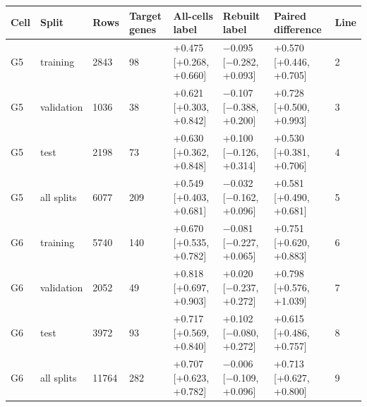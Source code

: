 \begin{tabular}{llllllll}
\toprule
Cell & Split & Rows & Target genes & All-cells label & Rebuilt label & Paired difference & Line \\
\midrule
G5 & training & 2843 & 98 & +0.475 [+0.268, +0.660] & −0.095 [−0.282, +0.093] & +0.570 [+0.446, +0.705] & 2 \\
G5 & validation & 1036 & 38 & +0.621 [+0.303, +0.842] & −0.107 [−0.388, +0.200] & +0.728 [+0.500, +0.993] & 3 \\
G5 & test & 2198 & 73 & +0.630 [+0.362, +0.848] & +0.100 [−0.126, +0.314] & +0.530 [+0.381, +0.706] & 4 \\
G5 & all splits & 6077 & 209 & +0.549 [+0.403, +0.681] & −0.032 [−0.162, +0.096] & +0.581 [+0.490, +0.681] & 5 \\
G6 & training & 5740 & 140 & +0.670 [+0.535, +0.782] & −0.081 [−0.227, +0.065] & +0.751 [+0.620, +0.883] & 6 \\
G6 & validation & 2052 & 49 & +0.818 [+0.697, +0.903] & +0.020 [−0.237, +0.272] & +0.798 [+0.576, +1.039] & 7 \\
G6 & test & 3972 & 93 & +0.717 [+0.569, +0.840] & +0.102 [−0.080, +0.272] & +0.615 [+0.486, +0.757] & 8 \\
G6 & all splits & 11764 & 282 & +0.707 [+0.623, +0.782] & −0.006 [−0.109, +0.096] & +0.713 [+0.627, +0.800] & 9 \\
\bottomrule
\end{tabular}

